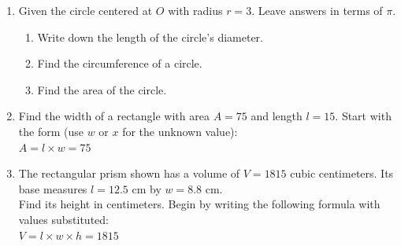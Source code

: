 \begin{enumerate}
\item Given the circle centered at $O$ with radius $r=3$. Leave answers in terms of $\pi$.
  \begin{multicols}{2}
    \begin{enumerate}
      \item Write down the length of the circle's diameter.
      \item Find the circumference of a circle. \vspace{1cm}
      \item Find the area of the circle.\vspace{1cm}
    \end{enumerate}
    \columnbreak
    \begin{flushright}
  \end{flushright}
  \end{multicols} \vspace{1cm}

\newpage
\item Find the width of a rectangle with area $A=75$ and length $l=15$. Start with the form (use $w$ or $x$ for the unknown value): \\[0.5cm]
$A = l \times w = 75$
  \begin{flushright}
  \end{flushright}

\item The rectangular prism shown has a volume of $V=1815$ cubic centimeters. Its base measures $l=12.5$ cm by $w=8.8$ cm. \\[0.5cm]
Find its height in centimeters. Begin by writing the following formula with values substituted: \\[0.5cm]
$V = l \times w \times h = 1815$
\begin{flushright}
\end{flushright}


\end{enumerate}
